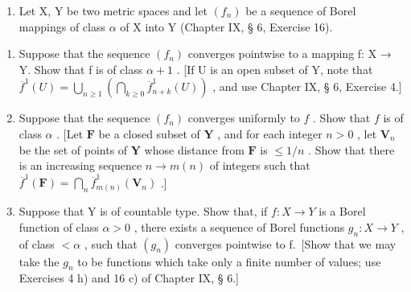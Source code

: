 \begin{enumerate}
\def\labelenumi{\arabic{enumi})}
\setcounter{enumi}{7}
\tightlist
\item
  Let X, Y be two metric spaces and let \((f_{n})\) be a sequence of Borel mappings of class \(\alpha\) of X into Y (Chapter IX, § 6, Exercise 16).
\end{enumerate}

\begin{enumerate}
\def\labelenumi{\alph{enumi})}
\item
  Suppose that the sequence \((f_{n})\) converges pointwise to a mapping f: X → Y. Show that f is of class \(\alpha + 1\) . {[}If U is an open subset of Y, note that \(\overline{f}^{1}(U) = \bigcup_{n \geqslant 1} \left( \bigcap_{k \geqslant 0} \overline{f}_{n+k}^{1}(U) \right)\) , and use Chapter IX, § 6, Exercise 4.{]}
\item
  Suppose that the sequence \((f_n)\) converges uniformly to \(f\) . Show that \(f\) is of class \(\alpha\) . {[}Let \(\mathbf{F}\) be a closed subset of \(\mathbf{Y}\) , and for each integer \(n > 0\) , let \(\mathbf{V}_n\) be the set of points of \(\mathbf{Y}\) whose distance from \(\mathbf{F}\) is \(\leqslant 1/n\) . Show that there is an increasing sequence \(n \to m(n)\) of integers such that \(\overline{f}^1(\mathbf{F}) = \bigcap_{n} \overline{f}_{m(n)}^1(\mathbf{V}_n)\) .{]}
\item
  Suppose that Y is of countable type. Show that, if \(f: X \to Y\) is a Borel function of class \(\alpha > 0\) , there exists a sequence of Borel functions \(g_{n}: X \to Y\) , of class \(<\alpha\) , such that \((g_{n})\) converges pointwise to f.~{[}Show that we may take the \(g_{n}\) to be functions which take only a finite number of values; use Exercises 4 h) and 16 c) of Chapter IX, § 6.{]}
\end{enumerate}

